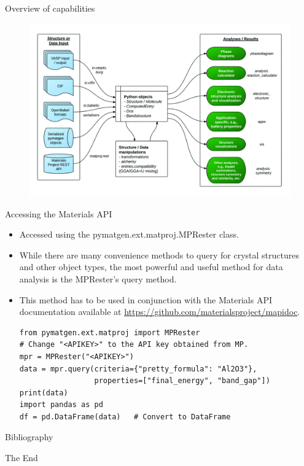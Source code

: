 \documentclass[aspectratio=169]{beamer}
\begin{document}
\begin{frame}{Overview of capabilities}
    \begin{figure}
        \centering
        \includegraphics[width=\textwidth]{figures/pymatgen-overview.jpg}
    \end{figure}
\end{frame}


\begin{frame}[fragile]{Accessing the Materials API}
    \begin{itemize}
        \item Accessed using the pymatgen.ext.matproj.MPRester class.
        \item While there are many convenience methods to query for crystal structures and other object types, the most powerful and useful method for data analysis is the MPRester's query method.
        \item This method has to be used in conjunction with the Materials API documentation available at \url{https://github.com/materialsproject/mapidoc}.
\begin{lstlisting}
from pymatgen.ext.matproj import MPRester
# Change "<APIKEY>" to the API key obtained from MP.
mpr = MPRester("<APIKEY>")
data = mpr.query(criteria={"pretty_formula": "Al2O3"}, 
                 properties=["final_energy", "band_gap"])
print(data)
import pandas as pd
df = pd.DataFrame(data)   # Convert to DataFrame
\end{lstlisting}
    \end{itemize}
\end{frame} 


\begin{frame}{Bibliography}
    \scriptsize{
    
    
    }
\end{frame}


\begin{frame}
    \Huge{\centerline{The End}}
\end{frame}
\end{document}
